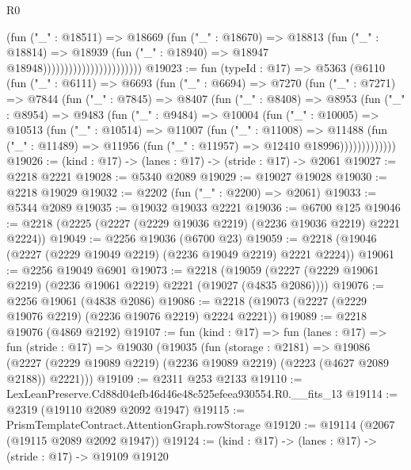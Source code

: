 \begin{lexlean}{R0}
\begin{coremodule}
                                          (fun ("_" : @18511) =>
                                          @18669
                                            (fun ("_" : @18670) =>
                                            @18813
                                              (fun ("_" : @18814) =>
                                              @18939
                                                (fun ("_" : @18940) =>
                                                @18947 @18948)))))))))))))))))))))))
@19023 := fun (typeId : @17) =>
  @5363
    (@6110
      (fun ("_" : @6111) =>
      @6693
        (fun ("_" : @6694) =>
        @7270
          (fun ("_" : @7271) =>
          @7844
            (fun ("_" : @7845) =>
            @8407
              (fun ("_" : @8408) =>
              @8953
                (fun ("_" : @8954) =>
                @9483
                  (fun ("_" : @9484) =>
                  @10004
                    (fun ("_" : @10005) =>
                    @10513
                      (fun ("_" : @10514) =>
                      @11007
                        (fun ("_" : @11008) =>
                        @11488
                          (fun ("_" : @11489) =>
                          @11956 (fun ("_" : @11957) => @12410 @18996)))))))))))))
@19026 := (kind : @17) -> (lanes : @17) -> (stride : @17) -> @2061
@19027 := @2218 @2221
@19028 := @5340 @2089
@19029 := @19027 @19028
@19030 := @2218 @19029
@19032 := @2202 (fun ("_" : @2200) => @2061)
@19033 := @5344 @2089
@19035 := @19032 @19033 @2221
@19036 := @6700 @125
@19046 := @2218 (@2225 (@2227 (@2229 @19036 @2219) (@2236 @19036 @2219) @2221 @2224))
@19049 := @2256 @19036 (@6700 @23)
@19059 := @2218 (@19046 (@2227 (@2229 @19049 @2219) (@2236 @19049 @2219) @2221 @2224))
@19061 := @2256 @19049 @6901
@19073 := @2218
    (@19059 (@2227 (@2229 @19061 @2219) (@2236 @19061 @2219) @2221 (@19027 (@4835 @2086))))
@19076 := @2256 @19061 (@4838 @2086)
@19086 := @2218 (@19073 (@2227 (@2229 @19076 @2219) (@2236 @19076 @2219) @2224 @2221))
@19089 := @2218 @19076 (@4869 @2192)
@19107 := fun (kind : @17) =>
  fun (lanes : @17) =>
  fun (stride : @17) =>
  @19030
    (@19035
      (fun (storage : @2181) =>
      @19086 (@2227 (@2229 @19089 @2219) (@2236 @19089 @2219) (@2223 (@4627 @2089 @2188)) @2221)))
@19109 := @2311 @253 @2133
@19110 := LexLeanPreserve.Cd88d04efb46d46e48c525efeea930554.R0.__fits_13
@19114 := @2319 (@19110 @2089 @2092 @1947)
@19115 := PrismTemplateContract.AttentionGraph.rowStorage
@19120 := @19114 (@2067 (@19115 @2089 @2092 @1947))
@19124 := (kind : @17) -> (lanes : @17) -> (stride : @17) -> @19109 @19120

\end{coremodule}
\end{lexlean}
